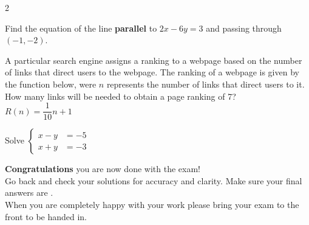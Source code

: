 \documentclass[addpoints,12pt,answers]{exam}
\begin{document}
\begin{questions}
\begin{multicols}{2}
\end{multicols}

\newpage

\question[5] Find the equation of the line \textbf{parallel} to $2x-6y=3$ and passing through $(-1,-2)$.\\
\answerline

\question[5] A particular search engine assigns a ranking to a webpage based on the number of links that direct users to the webpage. The ranking of a webpage is given by the function below, were $n$ represents the number of links that direct users to it. How many links will be needed to obtain a page ranking of 7?\\

$R(n)=\dfrac{1}{10}n+1$

\answerline

\newpage

\question[5] Solve $\left\{\begin{aligned}x-y &= -5\\ x+y &= -3\end{aligned}\right.$
\answerline


\end{questions}

\newpage

\begin{tcolorbox}[colback=gray!15,colframe=black]
{\Large \textbf{Congratulations} you are now done with the exam!}\\

{Go back and check your solutions for accuracy and clarity.  Make sure your final answers are . }\\

{When you are completely happy with your work please bring your exam to the front to be handed in. }
\end{tcolorbox}
\end{document}
